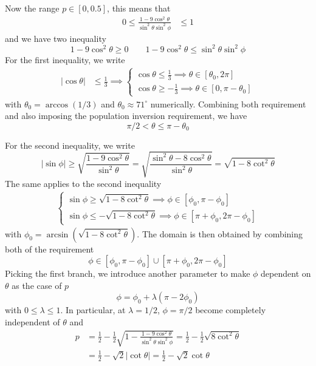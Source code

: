 \documentclass[../../../main.tex]{subfiles}
\begin{document}
Now the range $p \in [0,0.5]$, this  means that
\begin{align*}
  0\le
  \frac{1-9\cos^2\theta}
  {\sin^2\theta\sin^2\phi}
   & \le1
\end{align*}
and we have two inequality
\begin{equation*}
  1-9\cos^2\theta\ge0\qquad
  {1-9\cos^2\theta}\le
  {\sin^2\theta\sin^2\phi}
\end{equation*}
For the first inequality, we write
\begin{align*}
  |\cos\theta| & \le\frac13\implies
  \begin{cases}
    \cos \theta\le\frac13\implies \theta \in [\theta_0,2\pi] \\
    \cos\theta\ge-\frac13 \implies\theta \in [0,\pi-\theta_0]
  \end{cases}
\end{align*}
with $\theta_0 = \arccos(1/3)$ and $\theta_0 \approx 71^\circ$ numerically.
Combining both requirement and also imposing the population inversion requirement, we have
\begin{equation*}
  \pi/2 < \theta \le \pi - \theta_0
\end{equation*}

For the second inequality, we write
\begin{equation*}
  |\sin\phi|\ge
  \sqrt{  \frac{1-9\cos^2\theta}{\sin^2\theta}}
  =\sqrt{  \frac{\sin^2\theta-8\cos^2\theta}{\sin ^2\theta}}
  = \sqrt{ 1-8 \cot ^2 \theta}
\end{equation*}
The same applies to the second inequality
\begin{align*}
  \begin{cases}
    \sin \phi\ge  \sqrt{ 1-8 \cot ^2 \theta} \implies \phi\in  [\phi_0,\pi-\phi_0] \\
    \sin \phi \le -\sqrt{ 1-8 \cot ^2 \theta} \implies \phi\in [\pi+\phi_0,2\pi-\phi_0]
  \end{cases}
\end{align*}
with $\phi_0 = \arcsin (\sqrt{ 1-8 \cot ^2 \theta} )$.
The domain is then obtained by combining both of the requirement
\begin{equation*}
  \phi \in[\phi_0,\pi-\phi_0] \cup[\pi+\phi_0,2\pi-\phi_0]
\end{equation*}
Picking the first branch, we introduce another parameter to make $\phi$ dependent on $\theta$ as the case of $p$
\begin{equation*}
  \phi = \phi_0 + \lambda(\pi - 2\phi_0 )
\end{equation*}
with $0 \le \lambda \le 1$.
In particular, at $\lambda=1/2$, $\phi=\pi/2$ become completely independent of $\theta$ and
\begin{align*}
  p & =
  \frac{1 }{2 }- \frac{1 }{2} \sqrt{1 - \frac{1-9\cos^2\theta}{\sin^2\theta\sin^2\phi}}
  = \frac{1 }{2 }- \frac{1 }{2} \sqrt{8\cot^2\theta}                            \\
    & = \frac{1 }{2 }-  \sqrt{2}|\cot\theta|=\frac{1 }{2 }-  \sqrt{2}\cot\theta
\end{align*}
\end{document}
